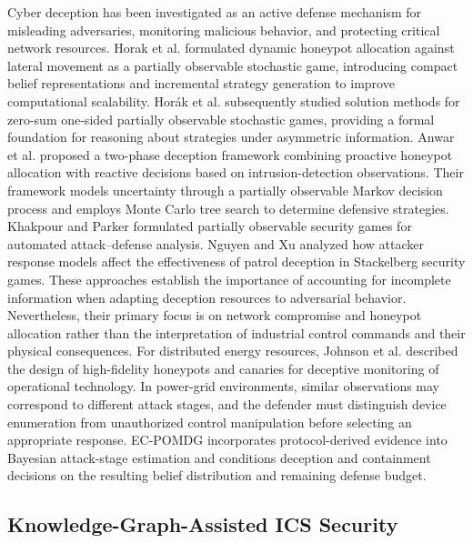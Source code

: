 \documentclass[10pt,conference]{IEEEtran}
\begin{document}
Cyber deception has been investigated as an active defense mechanism for misleading adversaries, monitoring malicious behavior, and protecting critical network resources. Horak et al. \cite{horak2019honeypots} formulated dynamic honeypot allocation against lateral movement as a partially observable stochastic game, introducing compact belief representations and incremental strategy generation to improve computational scalability. Hor\'{a}k et al. \cite{HORAK2023103838} subsequently studied solution methods for zero-sum one-sided partially observable stochastic games, providing a formal foundation for reasoning about strategies under asymmetric information. Anwar et al. \cite{anwar2022honeypot} proposed a two-phase deception framework combining proactive honeypot allocation with reactive decisions based on intrusion-detection observations. Their framework models uncertainty through a partially observable Markov decision process and employs Monte Carlo tree search to determine defensive strategies. Khakpour and Parker \cite{khakpour2022partiallyobservablesecuritygamesautomating} formulated partially observable security games for automated attack--defense analysis. Nguyen and Xu \cite{nguyen2022can} analyzed how attacker response models affect the effectiveness of patrol deception in Stackelberg security games. These approaches establish the importance of accounting for incomplete information when adapting deception resources to adversarial behavior. Nevertheless, their primary focus is on network compromise and honeypot allocation rather than the interpretation of industrial control commands and their physical consequences. For distributed energy resources, Johnson et al. \cite{johnson2021derhoneypots} described the design of high-fidelity honeypots and canaries for deceptive monitoring of operational technology. In power-grid environments, similar observations may correspond to different attack stages, and the defender must distinguish device enumeration from unauthorized control manipulation before selecting an appropriate response. EC-POMDG incorporates protocol-derived evidence into Bayesian attack-stage estimation and conditions deception and containment decisions on the resulting belief distribution and remaining defense budget.

\subsection{Knowledge-Graph-Assisted ICS Security}
\end{document}
